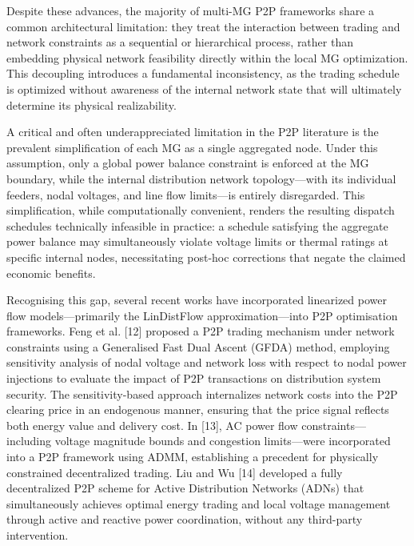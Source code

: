 \documentclass[preprint,12pt]{elsarticle}
\begin{document}
Despite these advances, the majority of multi-MG P2P frameworks share a common architectural limitation: they treat the interaction between trading and network constraints as a sequential or hierarchical process, rather than embedding physical network feasibility directly within the local MG optimization. This decoupling introduces a fundamental inconsistency, as the trading schedule is optimized without awareness of the internal network state that will ultimately determine its physical realizability.

A critical and often underappreciated limitation in the P2P literature is the prevalent simplification of each MG as a single aggregated node. Under this assumption, only a global power balance constraint is enforced at the MG boundary, while the internal distribution network topology—with its individual feeders, nodal voltages, and line flow limits—is entirely disregarded. This simplification, while computationally convenient, renders the resulting dispatch schedules technically infeasible in practice: a schedule satisfying the aggregate power balance may simultaneously violate voltage limits or thermal ratings at specific internal nodes, necessitating post-hoc corrections that negate the claimed economic benefits.

Recognising this gap, several recent works have incorporated linearized power flow models—primarily the LinDistFlow approximation—into P2P optimisation frameworks. Feng et al. [12] proposed a P2P trading mechanism under network constraints using a Generalised Fast Dual Ascent (GFDA) method, employing sensitivity analysis of nodal voltage and network loss with respect to nodal power injections to evaluate the impact of P2P transactions on distribution system security. The sensitivity-based approach internalizes network costs into the P2P clearing price in an endogenous manner, ensuring that the price signal reflects both energy value and delivery cost. In [13], AC power flow constraints—including voltage magnitude bounds and congestion limits—were incorporated into a P2P framework using ADMM, establishing a precedent for physically constrained decentralized trading. Liu and Wu [14] developed a fully decentralized P2P scheme for Active Distribution Networks (ADNs) that simultaneously achieves optimal energy trading and local voltage management through active and reactive power coordination, without any third-party intervention.
\end{document}
